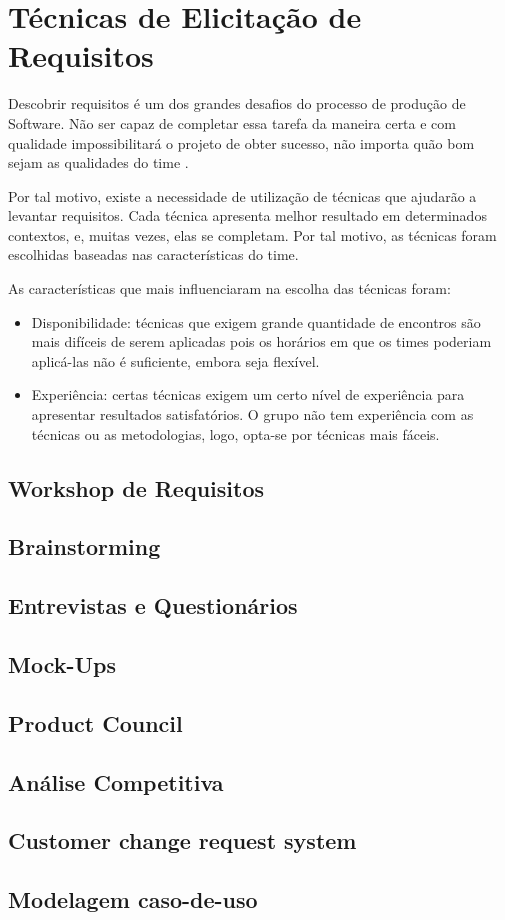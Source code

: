 \chapter[Técnicas de Elicitação de Requisitos]{Técnicas de Elicitação de Requisitos}
Descobrir requisitos é um dos grandes desafios do processo de produção de Software. Não ser capaz de completar essa tarefa da maneira certa e com qualidade impossibilitará o projeto de obter sucesso, não importa quão bom sejam as qualidades do time \cite{safe005}.

Por tal motivo, existe a necessidade de utilização de técnicas que ajudarão a levantar requisitos. Cada técnica apresenta melhor resultado em determinados contextos, e, muitas vezes, elas se completam. Por tal motivo, as técnicas foram escolhidas baseadas nas características do time.

As características que mais influenciaram na escolha das técnicas foram:
\begin{itemize}
  \item Disponibilidade: técnicas que exigem grande quantidade de encontros são mais difíceis de serem aplicadas pois os horários em que os times poderiam aplicá-las não é suficiente, embora seja flexível.
  \item Experiência: certas técnicas exigem um certo nível de experiência para apresentar resultados satisfatórios. O grupo não tem experiência com as técnicas ou as metodologias, logo, opta-se por técnicas mais fáceis.
\end{itemize}

\section{Workshop de Requisitos}

\section{Brainstorming}

\section{Entrevistas e Questionários}

\section{Mock-Ups}

\section{Product Council}

\section{Análise Competitiva}

\section{Customer change request system}

\section{Modelagem caso-de-uso}
